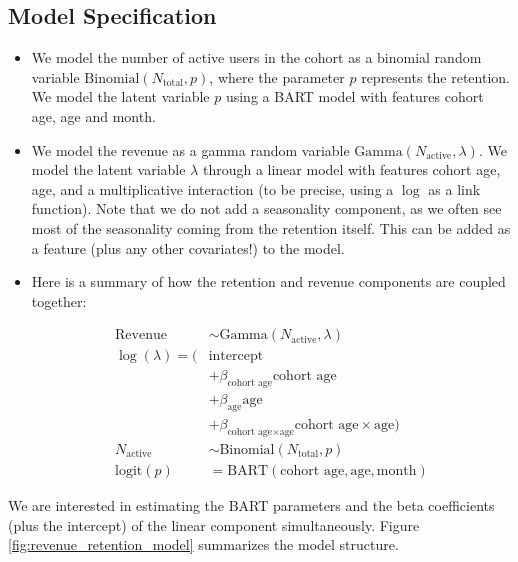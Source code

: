 \documentclass[11pt]{amsart}
\theoremstyle{definition}
\begin{document}
\subsection*{Model Specification} 
\begin{itemize}
    \item We model the number of active users in the cohort as a binomial random
        variable $\text{Binomial}(N_{\text{total}}, p)$, where the parameter $p$
        represents the retention. We model the latent variable $p$ using a BART model
        with features cohort age, age and month.
    
    \item We model the revenue as a gamma random variable
        $\text{Gamma}(N_{\text{active}}, \lambda)$. We model the latent variable
        $\lambda$ through a linear model with features cohort age, age, and a
        multiplicative interaction (to be precise, using a $\log$ as a link function).
        Note that we do not add a seasonality component, as we often see most of the
        seasonality coming from the retention itself. This can be added as a
        feature (plus any other covariates!) to the model.
    
    \item Here is a summary of how the retention and revenue components are coupled
        together:
    
    \begin{align*}
        \text{Revenue} & \sim \text{Gamma}(N_{\text{active}}, \lambda) \\
        \log(\lambda) = (& \text{intercept} \\
            & + \beta_{\text{cohort age}} \text{cohort age} \\
            & + \beta_{\text{age}} \text{age} \\
            & + \beta_{\text{cohort age} \times \text{age}} \text{cohort age} \times \text{age}) \\
        N_{\text{active}} & \sim \text{Binomial}(N_{\text{total}}, p) \\
        \textrm{logit}(p) & = \text{BART}(\text{cohort age}, \text{age}, \text{month})
    \end{align*}
    
\end{itemize}

We are interested in estimating the BART parameters and the beta coefficients (plus the
intercept) of the linear component simultaneously. Figure
\ref{fig:revenue_retention_model} summarizes the model structure.
\end{document}
